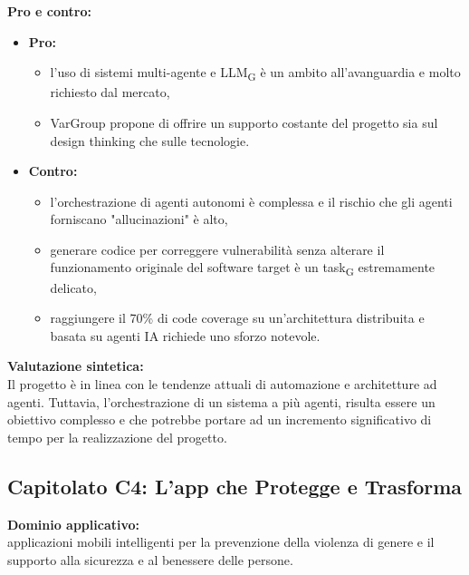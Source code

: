 \vspace{0.3cm}
\textbf{Pro e contro:}
\begin{itemize}
	\item \textbf{Pro:} 
        \begin{itemize}
            \item l'uso di sistemi multi-agente e LLM\textsubscript{G} è un ambito all'avanguardia e molto richiesto dal mercato,
            \item VarGroup propone di offrire un supporto costante del progetto sia sul design thinking che sulle tecnologie.
        \end{itemize}
	\item \textbf{Contro:}
        \begin{itemize}
            \item l'orchestrazione di agenti autonomi è complessa e il rischio che gli agenti forniscano "allucinazioni" è alto,
            \item generare codice per correggere vulnerabilità senza alterare il funzionamento originale del software target è un task\textsubscript{G} estremamente delicato,
            \item raggiungere il 70\% di code coverage su un'architettura distribuita e basata su agenti IA richiede uno sforzo notevole.
        \end{itemize}
\end{itemize}

\vspace{0.3cm}
\textbf{Valutazione sintetica:} \\
Il progetto è in linea con le tendenze attuali di automazione e architetture ad agenti. Tuttavia, l'orchestrazione di un sistema a più agenti, risulta essere un obiettivo complesso e che potrebbe portare ad un incremento significativo di tempo per la realizzazione del progetto.

\vspace{0.5cm}

\vspace{0.5cm}

\subsection{Capitolato C4: {L'app che Protegge e Trasforma} }

\textbf{Dominio applicativo:} \\
{applicazioni mobili intelligenti per la prevenzione della violenza di genere e il supporto alla sicurezza e al benessere delle persone.}

